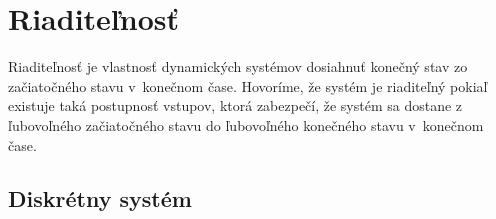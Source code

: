 \documentclass[a4paper, 10pt, ]{article}
\begin{document}
\bigskip

\normalsize
\normalfont



\section{Riaditeľnosť}

Riaditeľnosť je vlastnosť dynamických systémov dosiahnuť konečný stav zo začiatočného stavu v~konečnom čase. Hovoríme, že systém je riaditeľný pokiaľ existuje taká postupnosť vstupov, ktorá zabezpečí, že systém sa dostane z ľubovoľného začiatočného stavu do ľubovoľného konečného stavu v~konečnom čase.

\subsection{Diskrétny systém}
\end{document}
